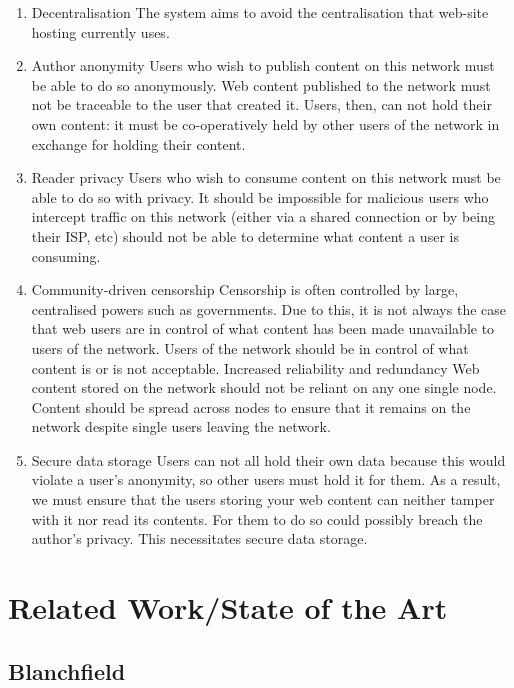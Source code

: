 \documentclass{article}
\begin{document}
\begin{enumerate}
    \item {Decentralisation
        The system aims to avoid the centralisation that web-site hosting currently uses.}
    \item{Author anonymity
        Users who wish to publish content on this network must be able to do so anonymously. Web content published to the network must not be traceable to the user that created it. Users, then, can not hold their own content: it must be co-operatively held by other users of the network in exchange for holding their content.}
    \item{Reader privacy
        Users who wish to consume content on this network must be able to do so with privacy. It should be impossible for malicious users who intercept traffic on this network (either via a shared connection or by being their ISP,  etc) should not be able to determine what content a user is consuming.}
    \item{Community-driven censorship
        Censorship is often controlled by large, centralised powers such as governments. Due to this, it is not always the case that web users are in control of what content has been made unavailable to users of the network. Users of the network should be in control of what content is or is not acceptable.
        Increased reliability and redundancy
        Web content stored on the network should not be reliant on any one single node. Content should be spread across nodes to ensure that it remains on the network despite single users leaving the network.}
    \item{Secure data storage
        Users can not all hold their own data because this would violate a user’s anonymity, so other users must hold it for them. As a result, we must ensure that the users storing your web content can neither tamper with it nor read its contents. For them to do so could possibly breach the author’s privacy. This necessitates secure data storage.}
\end{enumerate}

\section{Related Work/State of the Art}

\subsection{Blanchfield}
\end{document}
